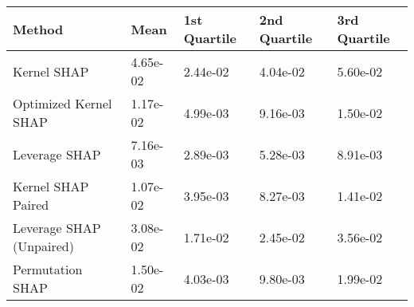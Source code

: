 \begin{tabular}{lllll}
  \toprule
  \textbf{Method} & \textbf{Mean} & \textbf{1st Quartile} & \textbf{2nd Quartile} & \textbf{3rd Quartile} \\ \midrule 
Kernel SHAP & 4.65e-02 & 2.44e-02 & 4.04e-02 & 5.60e-02\\
Optimized Kernel SHAP & \cellcolor{bronze!60}1.17e-02 & 4.99e-03 & \cellcolor{bronze!60}9.16e-03 & \cellcolor{bronze!60}1.50e-02\\
Leverage SHAP & \cellcolor{gold!60}7.16e-03 & \cellcolor{gold!60}2.89e-03 & \cellcolor{gold!60}5.28e-03 & \cellcolor{gold!60}8.91e-03\\
Kernel SHAP Paired & \cellcolor{silver!60}1.07e-02 & \cellcolor{silver!60}3.95e-03 & \cellcolor{silver!60}8.27e-03 & \cellcolor{silver!60}1.41e-02\\
Leverage SHAP (Unpaired) & 3.08e-02 & 1.71e-02 & 2.45e-02 & 3.56e-02\\
Permutation SHAP & 1.50e-02 & \cellcolor{bronze!60}4.03e-03 & 9.80e-03 & 1.99e-02\\
\bottomrule
\end{tabular}